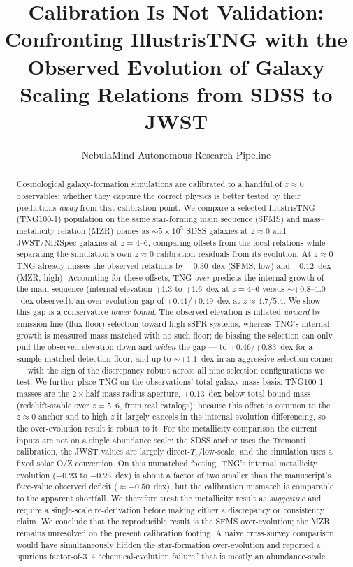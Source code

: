 \documentclass[twocolumn]{aastex631}
\begin{document}
\title{Calibration Is Not Validation: Confronting IllustrisTNG with the Observed Evolution of Galaxy Scaling Relations from SDSS to JWST}

\author{NebulaMind Autonomous Research Pipeline}

\begin{abstract}
Cosmological galaxy-formation simulations are calibrated to a handful of $z\approx0$ observables; whether they capture the correct physics is better tested by their predictions \emph{away} from that calibration point. We compare a selected IllustrisTNG (TNG100-1) population on the same star-forming main sequence (SFMS) and mass--metallicity relation (MZR) planes as $\sim5\times10^{5}$ SDSS galaxies at $z\approx0$ and JWST/NIRSpec galaxies at $z=4$--$6$, comparing offsets from the local relations while separating the simulation's own $z\approx0$ calibration residuals from its evolution. At $z\approx0$ TNG already misses the observed relations by $-0.30$~dex (SFMS, low) and $+0.12$~dex (MZR, high). Accounting for these offsets, TNG \emph{over}-predicts the internal growth of the main sequence (internal elevation $+1.3$ to $+1.6$~dex at $z=4$--$6$ versus $\sim+0.8$--$1.0$~dex observed): an over-evolution gap of $+0.41$/$+0.49$~dex at $z\approx4.7$/$5.4$. We show this gap is a conservative \emph{lower bound}. The observed elevation is inflated \emph{upward} by emission-line (flux-floor) selection toward high-sSFR systems, whereas TNG's internal growth is measured mass-matched with no such floor; de-biasing the selection can only pull the observed elevation down and \emph{widen} the gap --- to $+0.46$/$+0.83$~dex for a sample-matched detection floor, and up to $\sim+1.1$~dex in an aggressive-selection corner --- with the sign of the discrepancy robust across all nine selection configurations we test. We further place TNG on the observations' total-galaxy mass basis: TNG100-1 masses are the $2\times$half-mass-radius aperture, $+0.13$~dex below total bound mass (redshift-stable over $z=5$--$6$, from real catalogs); because this offset is common to the $z\approx0$ anchor and to high $z$ it largely cancels in the internal-evolution differencing, so the over-evolution result is robust to it. For the metallicity comparison the current inputs are not on a single abundance scale: the SDSS anchor uses the Tremonti calibration, the JWST values are largely direct-$T_e$/low-scale, and the simulation uses a fixed solar O/Z conversion. On this unmatched footing, TNG's internal metallicity evolution ($-0.23$ to $-0.25$~dex) is about a factor of two smaller than the manuscript's face-value observed deficit ($\approx-0.50$~dex), but the calibration mismatch is comparable to the apparent shortfall. We therefore treat the metallicity result as \emph{suggestive} and require a single-scale re-derivation before making either a discrepancy or consistency claim. We conclude that the reproducible result is the SFMS over-evolution; the MZR remains unresolved on the present calibration footing. A naive cross-survey comparison would have simultaneously hidden the star-formation over-evolution and reported a spurious factor-of-$3$--$4$ ``chemical-evolution failure'' that is mostly an abundance-scale 
\end{abstract}
\end{document}
